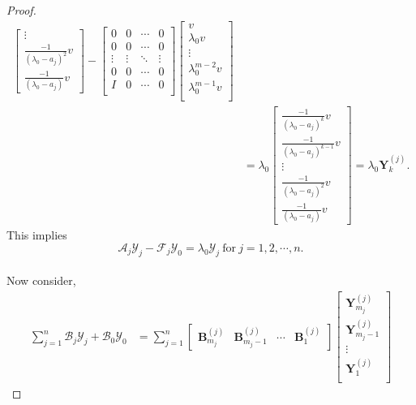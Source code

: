 \documentclass[12pt, reqno]{amsart}
\theoremstyle{definition}
\theoremstyle{remark}
\numberwithin{equation}{section}
\begin{document}
\begin{proof}
\begin{align*}
\begin{bmatrix}
    \vdots\\
    \frac{-1}{(\lambda_0-a_j)^2}v\\
    \frac{-1}{(\lambda_0-a_j)}v
\end{bmatrix}-\begin{bmatrix}
    0 & 0 & \cdots & 0\\
    0 & 0 & \cdots & 0\\
    \vdots & \vdots & \ddots & \vdots \\
    0 & 0 & \cdots &  0 \\
    I & 0 & \cdots & 0 \\
\end{bmatrix} \begin{bmatrix}
    v\\
    \lambda_0v\\
    \vdots\\
    \lambda_0^{m-2}v \\
    \lambda_0^{m-1}v\\
\end{bmatrix} \\ 
& = \lambda_0 \begin{bmatrix}
    \frac{-1}{(\lambda_0-a_j)^k} v\\
    \frac{-1}{(\lambda_0-a_j)^{k-1}} v\\
    \vdots\\
    \frac{-1}{(\lambda_0-a_j)^2}v\\
    \frac{-1}{(\lambda_0-a_j)}v
\end{bmatrix} = \lambda_0 \textbf{Y}_k^{(j)}. 
\end{align*}
This implies 
\begin{equation}\label{Eqn-a}
\mathcal{A}_{j} \mathcal{Y}_j-\mathcal{F}_{j}\mathcal{Y}_0  =\lambda_0 \mathcal{Y}_j  \ \text{for} \ j= 1, 2, \cdots, n. 
\end{equation}\\
Now consider,
\begin{align}
 \displaystyle \sum_{j=1}^{n} \mathcal{B}_j \mathcal{Y}_j+ \mathcal{B}_0\mathcal{Y}_0  
& = \sum_{j=1}^{n} \begin{bmatrix}
    \textbf{B}_{m_j}^{(j)} & \textbf{B}_{m_j -1}^{(j)} & \cdots & \textbf{B}_1^{(j)}  
\end{bmatrix} \begin{bmatrix}
    \textbf{Y}_{m_j}^{(j)}\\
    \textbf{Y}_{m_j -1}^{(j)}\\
    \vdots \\
    \textbf{Y}_1^{(j)}\\

\end{bmatrix}
\end{align}
\end{proof}
\end{document}
